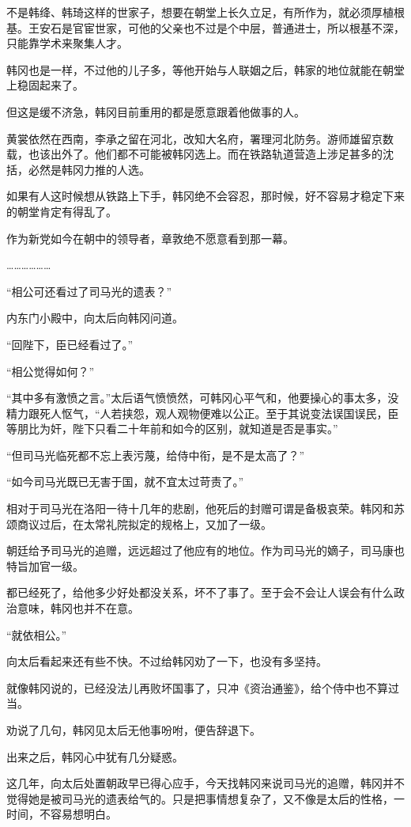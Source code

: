 不是韩绛、韩琦这样的世家子，想要在朝堂上长久立足，有所作为，就必须厚植根基。王安石是官宦世家，可他的父亲也不过是个中层，普通进士，所以根基不深，只能靠学术来聚集人才。

韩冈也是一样，不过他的儿子多，等他开始与人联姻之后，韩家的地位就能在朝堂上稳固起来了。

但这是缓不济急，韩冈目前重用的都是愿意跟着他做事的人。

黄裳依然在西南，李承之留在河北，改知大名府，署理河北防务。游师雄留京数载，也该出外了。他们都不可能被韩冈选上。而在铁路轨道营造上涉足甚多的沈括，必然是韩冈力推的人选。

如果有人这时候想从铁路上下手，韩冈绝不会容忍，那时候，好不容易才稳定下来的朝堂肯定有得乱了。

作为新党如今在朝中的领导者，章敦绝不愿意看到那一幕。

………………

“相公可还看过了司马光的遗表？”

内东门小殿中，向太后向韩冈问道。

“回陛下，臣已经看过了。”

“相公觉得如何？”

“其中多有激愤之言。”太后语气愤愤然，可韩冈心平气和，他要操心的事太多，没精力跟死人怄气，“人若挟怨，观人观物便难以公正。至于其说变法误国误民，臣等朋比为奸，陛下只看二十年前和如今的区别，就知道是否是事实。”

“但司马光临死都不忘上表污蔑，给侍中衔，是不是太高了？”

“如今司马光既已无害于国，就不宜太过苛责了。”

相对于司马光在洛阳一待十几年的悲剧，他死后的封赠可谓是备极哀荣。韩冈和苏颂商议过后，在太常礼院拟定的规格上，又加了一级。

朝廷给予司马光的追赠，远远超过了他应有的地位。作为司马光的嫡子，司马康也特旨加官一级。

都已经死了，给他多少好处都没关系，坏不了事了。至于会不会让人误会有什么政治意味，韩冈也并不在意。

“就依相公。”

向太后看起来还有些不快。不过给韩冈劝了一下，也没有多坚持。

就像韩冈说的，已经没法儿再败坏国事了，只冲《资治通鉴》，给个侍中也不算过当。

劝说了几句，韩冈见太后无他事吩咐，便告辞退下。

出来之后，韩冈心中犹有几分疑惑。

这几年，向太后处置朝政早已得心应手，今天找韩冈来说司马光的追赠，韩冈并不觉得她是被司马光的遗表给气的。只是把事情想复杂了，又不像是太后的性格，一时间，不容易想明白。

